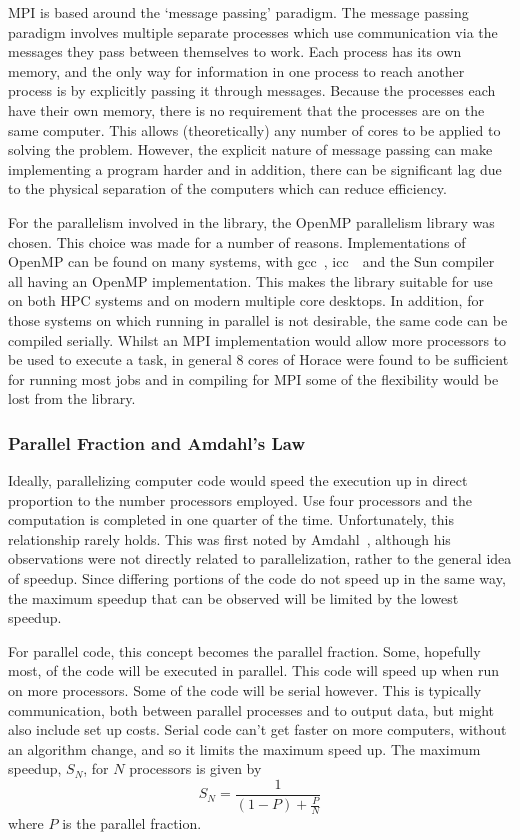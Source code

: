 MPI is based around the `message passing' paradigm.
The message passing paradigm involves multiple separate processes which use
communication via the messages they pass between themselves to work.
Each process has its own memory, and the only way for information in one process
to reach another process is by explicitly passing it through messages.
Because the processes each have their own memory, there is no requirement that
the processes are on the same computer.
This allows (theoretically) any number of cores to be applied to solving the
problem.
However, the explicit nature of message passing can make implementing a program
harder and in addition, there can be significant lag due to the physical
separation of the computers which can reduce efficiency.

For the parallelism involved in the library, the OpenMP parallelism library was
chosen.
This choice was made for a number of reasons.
Implementations of OpenMP can be found on many systems, with gcc~\cite{gcc},
icc~\cite{icc}\ and the
Sun compiler all having an OpenMP implementation.
This makes the library suitable for use on both HPC systems and on modern
multiple core desktops.
In addition, for those systems on which running in parallel is not desirable,
the same code can be compiled serially.
Whilst an MPI implementation would allow more processors to be used to execute a
task, in general 8 cores of Horace were found to be sufficient for running most
jobs and in compiling for MPI some of the flexibility would be lost from the
library.

\subsubsection{Parallel Fraction and Amdahl's Law}

Ideally, parallelizing computer code would speed the execution up in direct
proportion to the number processors employed.
Use four processors and the computation is completed in one quarter of the time.
Unfortunately, this relationship rarely holds.
This was first noted by Amdahl~\cite{Amdahl1967}, although his observations were
not directly related to parallelization, rather to the general idea of speedup.
Since differing portions of the code do not speed up in the same way, the
maximum speedup that can be observed will be limited by the lowest speedup.

For parallel code, this concept becomes the parallel fraction.
Some, hopefully most, of the code will be executed in parallel.
This code will speed up when run on more processors.
Some of the code will be serial however.
This is typically communication, both between parallel processes and to output
data, but might also include set up costs.
Serial code can't get faster on more computers, without an algorithm change, and
so it limits the maximum speed up.
The maximum speedup, $S_N$, for $N$ processors is given by
\begin{equation}
\label{eqn:toolkit:amdahl}
S_N = \frac{1}{\left(1 - P\right) + \frac{P}{N}}
\end{equation}
where $P$ is the parallel fraction.

